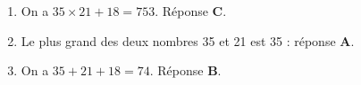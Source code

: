 
\medskip 

%
%

%      
\begin{enumerate}
\item On a $35 \times 21 + 18 = 753$. Réponse \textbf{C}.
\item Le plus grand des deux nombres 35 et 21 est 35 : réponse \textbf{A}.
\item On a $35 + 21 + 18 = 74$. Réponse \textbf{B}.
\end{enumerate}
